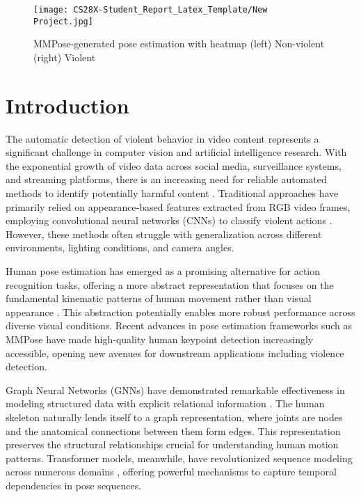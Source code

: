 \documentclass[conference]{IEEEtran}
\begin{document}
\begin{figure*}
    \centering
    \texttt{[image: CS28X-Student\_Report\_Latex\_Template/New Project.jpg]}
    \caption{MMPose-generated pose estimation with heatmap (left) Non-violent (right) Violent}
    \label{fig:enter-label}
\end{figure*}

\section{Introduction}
The automatic detection of violent behavior in video content represents a
significant challenge in computer vision and artificial intelligence research.
With the exponential growth of video data across social media, surveillance
systems, and streaming platforms, there is an increasing need for reliable
automated methods to identify potentially harmful content
\cite{demarty2014violent}. Traditional approaches have primarily relied on
appearance-based features extracted from RGB video frames, employing
convolutional neural networks (CNNs) to classify violent actions
\cite{sudhakaran2017learning}. However, these methods often struggle with
generalization across different environments, lighting conditions, and camera
angles.

Human pose estimation has emerged as a promising alternative for action
recognition tasks, offering a more abstract representation that focuses on the
fundamental kinematic patterns of human movement rather than visual appearance
\cite{liu2020disentangling}. This abstraction potentially enables more robust
performance across diverse visual conditions. Recent advances in pose
estimation frameworks such as MMPose \cite{mmpose2020} have made high-quality
human keypoint detection increasingly accessible, opening new avenues for
downstream applications including violence detection.

Graph Neural Networks (GNNs) have demonstrated remarkable effectiveness in
modeling structured data with explicit relational information
\cite{kipf2017semi, velivckovic2018graph}. The human skeleton naturally lends
itself to a graph representation, where joints are nodes and the anatomical
connections between them form edges. This representation preserves the
structural relationships crucial for understanding human motion patterns.
Transformer models, meanwhile, have revolutionized sequence modeling across
numerous domains \cite{vaswani2017attention}, offering powerful mechanisms to
capture temporal dependencies in pose sequences.
\end{document}
